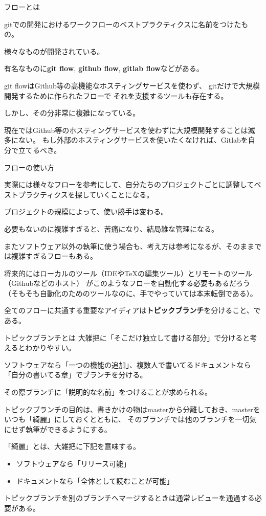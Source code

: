 \documentclass[12pt, unicode]{beamer}
\begin{document}
\begin{frame}{フローとは}

gitでの開発におけるワークフローのベストプラクティクスに名前をつけたもの。

様々なものが開発されている。

有名なものに\textbf{git flow}, \textbf{github flow}, \textbf{gitlab flow}などがある。

git flowはGithub等の高機能なホスティングサービスを使わず、
gitだけで大規模開発するために作られたフローで
それを支援するツールも存在する。

しかし、その分非常に複雑になっている。

現在ではGithub等のホスティングサービスを使わずに大規模開発することは滅多にない。
もし外部のホスティングサービスを使いたくなければ、Gitlabを自分で立てるべき。

\end{frame}
\begin{frame}{フローの使い方}

実際には様々なフローを参考にして、自分たちのプロジェクトごとに調整してベストプラクティクスを探していくことになる。

プロジェクトの規模によって、使い勝手は変わる。

必要もないのに複雑すぎると、苦痛になり、結局雑な管理になる。

またソフトウェア以外の執筆に使う場合も、考え方は参考になるが、そのままでは複雑すぎるフローもある。

将来的にはローカルのツール（IDEやTeXの編集ツール）とリモートのツール（Githubなどのホスト）
がこのようなフローを自動化する必要もあるだろう（そもそも自動化のためのツールなのに、手でやっていては本末転倒である）。

全てのフローに共通する重要なアイディアは\textbf{トピックブランチ}を分けること、である。

\end{frame}
\begin{frame}{トピックブランチとは}
大雑把に「そこだけ独立して書ける部分」で分けると考えるとわかりやすい。

ソフトウェアなら「一つの機能の追加」、複数人で書いてるドキュメントなら「自分の書いてる章」でブランチを分ける。

その際ブランチに「説明的な名前」をつけることが求められる。

トピックブランチの目的は、書きかけの物はmasterから分離しておき、masterをいつも「綺麗」にしておくとともに、
そのブランチでは他のブランチを一切気にせず執筆ができるようにする。

「綺麗」とは、大雑把に下記を意味する。
\begin{itemize}
\item ソフトウェアなら「リリース可能」
\item ドキュメントなら「全体として読むことが可能」
\end{itemize}


トピックブランチを別のブランチへマージするときは通常レビューを通過する必要がある。
\end{frame}
\end{document}
